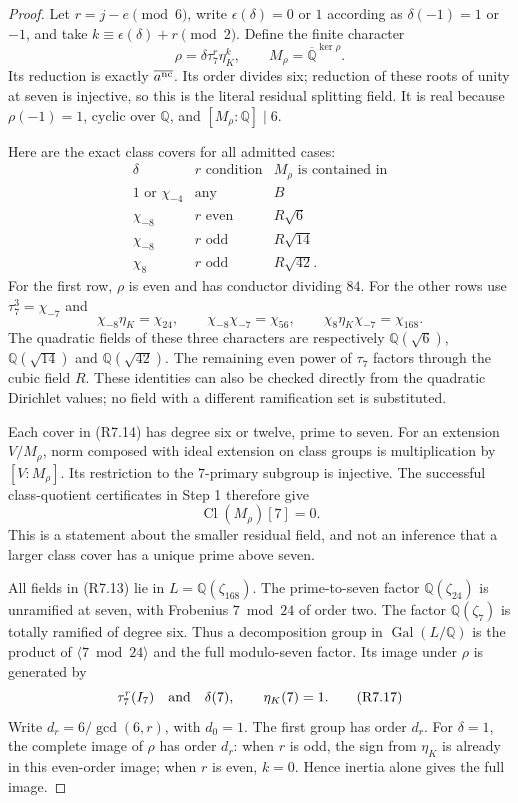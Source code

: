 \begin{proof}
Let $r=j-e\pmod6$, write $\epsilon(\delta)=0$ or $1$ according
as $\delta(-1)=1$ or $-1$, and take
$k\equiv\epsilon(\delta)+r\pmod2$.
Define the finite character
\[
       \rho=\delta\tau_7^r\eta_K^k,
       \qquad M_\rho=\overline{\mathbb Q}^{\ker\rho}.
 \tag{R7.13}
\]
Its reduction is exactly $\overline{a^{\rm nc}}$.
Its order divides six; reduction of these roots of unity at
seven is injective, so this is the literal residual splitting field.
It is real because $\rho(-1)=1$, cyclic over $\mathbb Q$, and
$[M_\rho:\mathbb Q]\mid6$.

Here are the exact class covers for all admitted cases:
\[
 \begin{array}{c|c|c}
 \delta& r\text{ condition}&M_\rho\text{ is contained in}\\\hline
 1\text{ or }\chi_{-4}&\text{any}&B\\
 \chi_{-8}&r\text{ even}&R\sqrt6\\
 \chi_{-8}&r\text{ odd}&R\sqrt{14}\\
 \chi_8&r\text{ odd}&R\sqrt{42}.
 \end{array}\tag{R7.14}
\]
For the first row, $\rho$ is even and has conductor dividing $84$.
For the other rows use $\tau_7^3=\chi_{-7}$ and
\[
 \chi_{-8}\eta_K=\chi_{24},\qquad
 \chi_{-8}\chi_{-7}=\chi_{56},\qquad
 \chi_8\eta_K\chi_{-7}=\chi_{168}.
 \tag{R7.15}
\]
The quadratic fields of these three characters are respectively
$\mathbb Q(\sqrt6)$, $\mathbb Q(\sqrt{14})$ and
$\mathbb Q(\sqrt{42})$. The remaining even power of $\tau_7$
factors through the cubic field $R$.
These identities can also be checked directly from the quadratic
Dirichlet values; no field with a different ramification set is substituted.

Each cover in (R7.14) has degree six or twelve, prime to seven.
For an extension $V/M_\rho$, norm composed with ideal extension
on class groups is multiplication by $[V:M_\rho]$.
Its restriction to the $7$-primary subgroup is injective.
The successful class-quotient certificates in Step 1 therefore give
\[
                         \operatorname{Cl}(M_\rho)[7]=0.
 \tag{R7.16}
\]
This is a statement about the smaller residual field, and not
an inference that a larger class cover has a unique prime above seven.

All fields in (R7.13) lie in $L=\mathbb Q(\zeta_{168})$.
The prime-to-seven factor $\mathbb Q(\zeta_{24})$ is unramified
at seven, with Frobenius $7\bmod24$ of order two.
The factor $\mathbb Q(\zeta_7)$ is totally ramified of degree six.
Thus a decomposition group in $\operatorname{Gal}(L/\mathbb Q)$
is the product of $\langle7\bmod24\rangle$ and the full
modulo-seven factor. Its image under $\rho$ is generated by
\[
          \tau_7^r(I_7)\quad\hbox{and}\quad\delta(7),
                    \qquad \eta_K(7)=1.
 \tag{R7.17}
\]
Write $d_r=6/\gcd(6,r)$, with $d_0=1$.
The first group has order $d_r$.
For $\delta=1$, the complete image of $\rho$ has order $d_r$:
when $r$ is odd, the sign from $\eta_K$ is already in this
even-order image; when $r$ is even, $k=0$.
Hence inertia alone gives the full image.


\end{proof}
